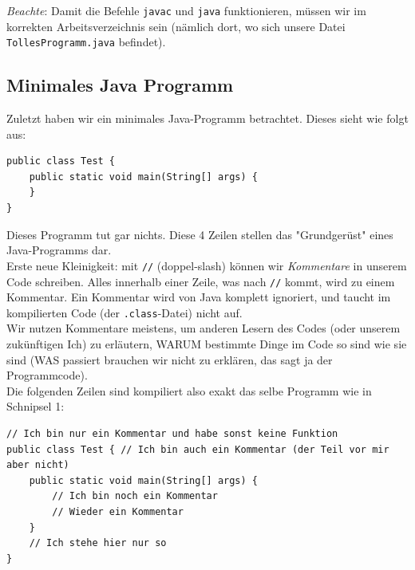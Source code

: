 \documentclass[ngerman,11pt]{article}
\begin{document}
    \textit{Beachte}: Damit die Befehle \lstinline{javac} und \lstinline{java} funktionieren, müssen wir im korrekten Arbeitsverzeichnis sein
    (nämlich dort, wo sich unsere Datei \lstinline{TollesProgramm.java} befindet).

    \vspace{0.5cm}

    \subsection{Minimales Java Programm}
    Zuletzt haben wir ein minimales Java-Programm betrachtet.
    Dieses sieht wie folgt aus:

    \begin{lstlisting}[label={lst:minimal_java},caption=Minimales Java Programm]
public class Test {
    public static void main(String[] args) {
    }
}
    \end{lstlisting}

    Dieses Programm tut gar nichts.
    Diese 4 Zeilen stellen das "Grundgerüst" eines Java-Programms dar. \\

    Erste neue Kleinigkeit: mit \lstinline{//} (doppel-slash) können wir \textit{Kommentare} in unserem
    Code schreiben.
    Alles innerhalb einer Zeile, was nach \lstinline{//} kommt, wird zu einem Kommentar.
    Ein Kommentar wird von Java komplett ignoriert, und taucht im kompilierten Code (der \lstinline{.class}-Datei) nicht auf. \\

    Wir nutzen Kommentare meistens, um anderen Lesern des Codes (oder unserem zukünftigen Ich) zu erläutern, WARUM
    bestimmte Dinge im Code so sind wie sie sind (WAS passiert brauchen wir nicht zu erklären, das sagt ja der Programmcode). \\

    Die folgenden Zeilen sind kompiliert also exakt das selbe Programm wie in Schnipsel 1:

    \begin{lstlisting}[caption=Kommentare]
// Ich bin nur ein Kommentar und habe sonst keine Funktion
public class Test { // Ich bin auch ein Kommentar (der Teil vor mir aber nicht)
    public static void main(String[] args) {
        // Ich bin noch ein Kommentar
        // Wieder ein Kommentar
    }
    // Ich stehe hier nur so
}
    \end{lstlisting}

    \vspace{0.5cm}
\end{document}
